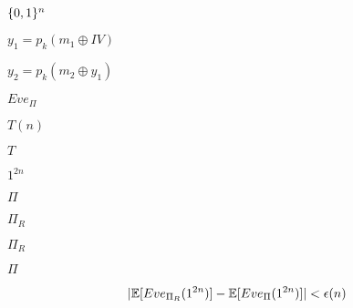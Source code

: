 \documentclass[10pt]{book}
\begin{document}
\begin{mdSnippets}
\begin{mdInlineSnippet}[5867c9b098884eca2779f6d98d4b0b29]%
$\{0,1\}^n$\end{mdInlineSnippet}%
\begin{mdInlineSnippet}[018554fcda4a68a1a91ba02f18df0147]%
$y_1 = p_k(m_1 \oplus IV)$\end{mdInlineSnippet}%
\begin{mdInlineSnippet}[eea7668fc638e5ae4536a6a09a8d4944]%
$y_2 = p_k(m_2 \oplus y_1)$\end{mdInlineSnippet}%
\begin{mdInlineSnippet}%
$Eve_{\Pi}$\end{mdInlineSnippet}%
\begin{mdInlineSnippet}[514884be093e9ab7909b0d394e7b74d2]%
$T(n)$\end{mdInlineSnippet}%
\begin{mdInlineSnippet}%
$T$\end{mdInlineSnippet}%
\begin{mdInlineSnippet}[0bb2a9040d090145aff6b7570cb4f7c1]%
$1^{2n}$\end{mdInlineSnippet}%
\begin{mdInlineSnippet}[d744af1210420bc542a6a63b938a5601]%
$\Pi$\end{mdInlineSnippet}%
\begin{mdInlineSnippet}[55c84cfd5af39fe92458812f2ab5b5a1]%
$\Pi_R$\end{mdInlineSnippet}%
\begin{mdInlineSnippet}[55c84cfd5af39fe92458812f2ab5b5a1]%
$\Pi_R$\end{mdInlineSnippet}%
\begin{mdInlineSnippet}[d744af1210420bc542a6a63b938a5601]%
$\Pi$\end{mdInlineSnippet}%
\begin{mdDisplaySnippet}[1c045529eef7a3b2b512799aa6fc71c6]%
\[%
|\E[Eve_{\Pi_R}(1^{2n})] - \E[Eve_{\Pi}(1^{2n})] | < \epsilon(n)
\]%
\end{mdDisplaySnippet}%
\begin{mdInlineSnippet}[92e4da341fe8f4cd46192f21b6ff3aa7]%

\end{mdInlineSnippet}
\end{mdSnippets}
\end{document}
